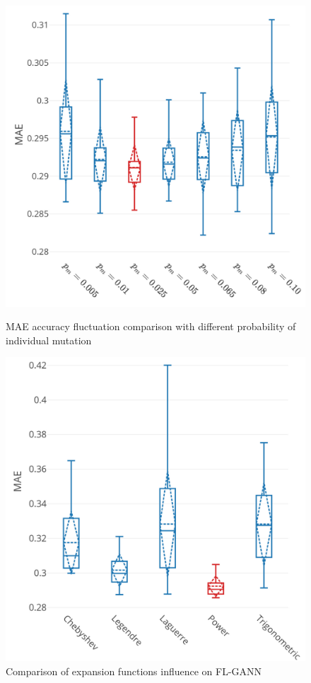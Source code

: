 \documentclass[conference]{IEEEtran}
\begin{document}
\begin{figure}[h]
	\centering
	\begin{minipage}[t]{8cm}
		\centering
		\includegraphics[width=0.75\textwidth =0.2cm 0.2cm 0.2cm 0.2cm]{images/tn2_multi_cpu_best_pm.pdf}
		\caption{MAE accuracy fluctuation comparison with different probability of individual mutation }
		\label{tn2_CPU_pm_FLGANN}
	\end{minipage}
	\hspace{0.5cm}
	\begin{minipage}[t]{8cm}
		\centering
		\includegraphics[width=0.75\textwidth =0.2cm 0.2cm 0.2cm 0.2cm]{images/tn2_multi_cpu_function.pdf}
		\caption{Comparison of expansion functions influence on FL-GANN}
		\label{tn3_CPU_function_FLGANN}
	\end{minipage}
\end{figure}
\end{document}
